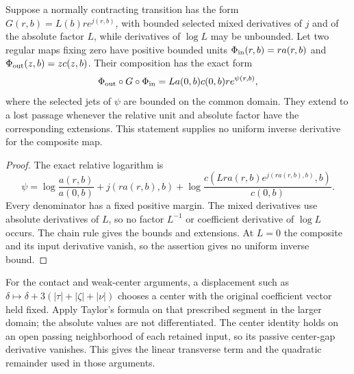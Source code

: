 \begin{lemma}
\label{rw:app:flat-composition}
Suppose a normally contracting transition has the form
$G(r,b)=L(b)r e^{j(r,b)}$, with bounded selected mixed derivatives
of $j$ and of the absolute factor $L$, while derivatives of
$\log L$ may be unbounded. Let two regular maps fixing zero have
positive bounded units
$\Phi_{\rm in}(r,b)=r a(r,b)$ and
$\Phi_{\rm out}(z,b)=z c(z,b)$. Their composition has the exact form
\[
 \Phi_{\rm out}\circ G\circ\Phi_{\rm in}
       =L a(0,b)c(0,b)r e^{\psi(r,b)},
\]
where the selected jets of $\psi$ are bounded on the common domain.
They extend to a lost passage whenever the relative unit and absolute
factor have the corresponding extensions. This statement supplies no
uniform inverse derivative for the composite map.
\end{lemma}
\begin{proof}
The exact relative logarithm is
\[
 \psi=\log\frac{a(r,b)}{a(0,b)}+j(ra(r,b),b)
 +\log\frac{c(Lra(r,b)e^{j(ra(r,b),b)},b)}{c(0,b)}.
\]
Every denominator has a fixed positive margin. The mixed derivatives
use absolute derivatives of $L$, so no factor $L^{-1}$ or coefficient
derivative of $\log L$ occurs. The chain rule gives the bounds and
extensions. At $L=0$ the composite and its input derivative vanish,
so the assertion gives no uniform inverse bound.
\end{proof}

For the contact and weak-center arguments, a displacement such as
$\delta\mapsto\delta+3(|\tau|+|\zeta|+|\nu|)$ chooses a center
with the original coefficient vector held fixed. Apply Taylor's formula
on that prescribed segment in the larger domain; the absolute values
are not differentiated. The center identity holds on an open passing
neighborhood of each retained input, so its passive center-gap
derivative vanishes. This gives the linear transverse term and the
quadratic remainder used in those arguments.
